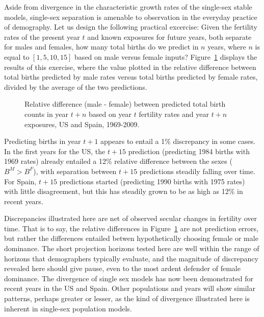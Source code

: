  \FloatBarrier
Aside from divergence in the characteristic growth rates of the single-sex
stable models, single-sex separation is amenable to observation in the everyday
practice of demography. Let us design the following practical excercise:
Given the fertility rates of the present year $t$ and known exposures for
future years, both separate for males and females, how many total births do we
predict in $n$ years, where $n$ is equal to $[1, 5, 10, 15]$ based on male
versus female inputs? Figure~\ref{fig:BirthCountDivergenceAge} displays the
results of this exercise, where the value plotted in the relative difference
between total births predicted by male rates versus total births predicted by
female rates, divided by the average of the two predictions.

\begin{figure}[ht!]
        \centering  
          \caption{Relative difference (male - female) between predicted total
          birth counts in year $t+n$ based on year $t$ fertility rates and year $t+n$ exposures, US and Spain, 1969-2009.}
          \label{fig:BirthCountDivergenceAge}
\end{figure}

Predicting births in year $t+1$ appears to entail a 1\% discrepancy in some
cases. In the first years for the US, the $t+15$ prediction (predicting
1984 births with 1969 rates) already entailed a 12\% relative difference
between the sexes ($B^M > B^F$), with separation between $t+15$ predictions
steadily falling over time. For Spain, $t+15$ predictions started (predicting 1990
births with 1975 rates) with little disagreement, but this has steadily grown to be as high
as 12\% in recent years.

Discrepancies illustrated here are net of observed secular changes in
fertility over time. That is to say, the relative differences in
Figure~\ref{fig:BirthCountDivergenceAge} are not prediction errors, but rather
the differences entailed betwen hypothetically choosing female or male
dominance. The short projection horizons tested here are well within the range
of horizons that demographers typically evaluate, and the magnitude of
discrepancy revealed here should give pause, even to the most ardent defender
of female dominance. The divergence of single sex
models has now been demonstrated for recent years in the US and Spain. Other
populations and years will show similar patterns, perhaps greater or lesser, as
the kind of divergence illustrated here is inherent in single-sex
population models.

